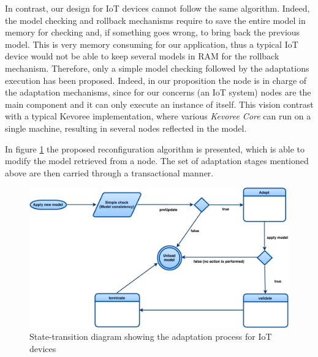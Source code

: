 In contrast, our design for IoT devices cannot follow the same algorithm.
Indeed, the model checking and rollback mechanisms require to save the entire model in memory for checking and, if something goes wrong, to bring back the previous model.
This is very memory consuming for our application, thus a typical IoT device would not be able to keep several models in RAM for the rollback mechanism.
Therefore, only a simple model checking followed by the adaptations execution has been proposed.
Indeed, in our proposition the node is in charge of the adaptation mechanisms, since for our concerns (an IoT system) nodes are the main component and it can only execute an instance of itself.
This vision contrast with a typical Kevoree implementation, where various \textit{Kevoree Core} can run on a single machine, resulting in several nodes reflected in the model.

In figure \ref{fig:MAR_modelListenerIoT} the proposed reconfiguration algorithm is presented, which is able to modify the model retrieved from a node.  The set of adaptation stages mentioned above are then carried through a transactional manner.

\begin{figure}[]
	\centering
	\includegraphics[width=0.85\columnwidth]{chapters/modelsAtRuntimeIoT.images/modelListenerIoT.pdf}
	\caption{State-transition diagram showing the adaptation process for IoT devices}
	\label{fig:MAR_modelListenerIoT}
\end{figure}

